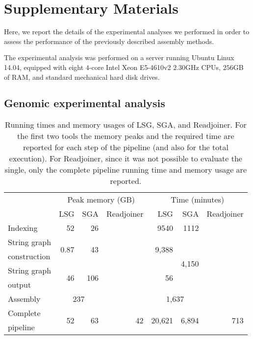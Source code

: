 \documentclass[11pt,oneside,a4paper]{article}
\begin{document}
\newpage
\section*{Supplementary Materials}
Here, we report the details of the experimental analyses we performed
in order to assess the performance of the previously described assembly
methods.

The experimental analysis was performed on a server running Ubuntu
Linux 14.04, equipped with eight $4$-core Intel Xeon E5-4610v2
$2.30$GHz CPUs, $256$GB of RAM, and standard mechanical hard disk
drives.

\subsection*{Genomic experimental analysis}

\begin{table}[hb!]
\caption{Running times and memory usages of LSG,
SGA, and Readjoiner.
For the first two tools the memory peaks and the required time are reported for each step of the pipeline (and also for the total execution). For Readjoiner, since it was not possible to evaluate the single, only the complete pipeline running time and memory usage are reported.}
\begin{center}
\begin{tabular}{l|r|r|r|r|r|r}
\toprule
& \multicolumn{3}{c|}{Peak memory (GB)} & \multicolumn{3}{c}{Time (minutes)} \\
& LSG & SGA & Readjoiner & LSG & SGA & Readjoiner \\
\midrule
Indexing & 52 & 26 &  & 9540 & 1112 & \\
\midrule
String graph & \multirow{2}{*}{0.87} & \multirow{2}{*}{43} &  &
\multirow{2}{*}{9,388} & \multirow{4}{*}{4,150} &  \\
construction & & &  & & & \\
\cmidrule{1-3}\cmidrule{5-5}
String graph & \multirow{2}{*}{46} & \multirow{2}{*}{106} &  &
\multirow{2}{*}{56} & &  \\
output & & &  & & &  \\
\midrule
Assembly & \multicolumn{2}{c|}{237} & & \multicolumn{2}{c|}{1,637} & \\
\midrule
Complete & \multirow{2}{*}{52} & \multirow{2}{*}{63} &
\multirow{2}{*}{42} & \multirow{2}{*}{20,621} &
\multirow{2}{*}{6,894} & \multirow{2}{*}{713} \\
pipeline & & & & & & \\
\bottomrule
\end{tabular}
\end{center}
\label{table:full-dataset-total-times}
\end{table}
\end{document}

